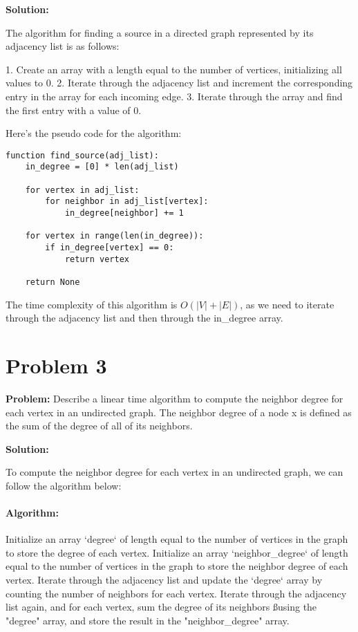 \documentclass[11pt]{article}
\begin{document}
    \textbf{Solution:}

    The algorithm for finding a source in a directed graph represented by its adjacency list is as follows:

    1. Create an array with a length equal to the number of vertices, initializing all values to 0.
    2. Iterate through the adjacency list and increment the corresponding entry in the array for each incoming edge.
    3. Iterate through the array and find the first entry with a value of 0.

    Here's the pseudo code for the algorithm:

    \begin{verbatim}
function find_source(adj_list):
    in_degree = [0] * len(adj_list)

    for vertex in adj_list:
        for neighbor in adj_list[vertex]:
            in_degree[neighbor] += 1

    for vertex in range(len(in_degree)):
        if in_degree[vertex] == 0:
            return vertex

    return None
    \end{verbatim}

    The time complexity of this algorithm is $O(|V| + |E|)$, as we need to iterate through the adjacency list and then through the in_degree array.


    \section{Problem 3}

    \textbf{Problem:} Describe a linear time algorithm to compute the neighbor degree for each vertex in an undirected graph. The neighbor degree of a node x is defined as the sum of the degree of all of its neighbors.

    \textbf{Solution:}

    To compute the neighbor degree for each vertex in an undirected graph, we can follow the algorithm below:

    \paragraph{Algorithm:}
    Initialize an array `degree` of length equal to the number of vertices in the graph
    to store the degree of each vertex.
    Initialize an array `neighbor_degree` of length equal to the number of vertices in the graph
    to store the neighbor degree of each vertex.
    Iterate through the adjacency list and update the `degree` array by counting the number of neighbors
    for each vertex.
    Iterate through the adjacency list again, and for each vertex, sum the degree of its neighbors
    ßusing the "degree" array, and store the result in the "neighbor_degree" array.
\end{document}

